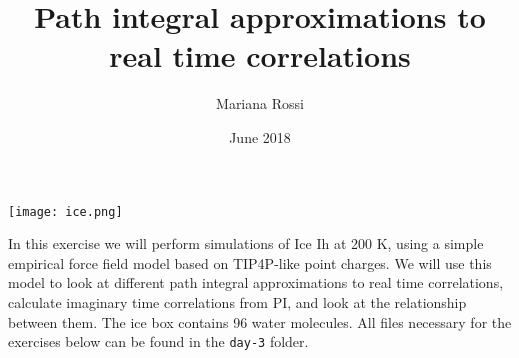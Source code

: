 \documentclass{article}
\title{Path integral approximations to real time correlations}
\author{Mariana Rossi}
\date{June 2018}
\begin{document}
\maketitle

\begin{figure*}[ht]
\centering
\texttt{[image: ice.png]}
\end{figure*}

In this exercise we will perform
simulations of Ice Ih at 200 K,
using a simple empirical force field model based
on TIP4P-like point charges. We will use this model to look
at different path integral approximations to real time correlations, calculate imaginary
time correlations from PI, and look at the relationship between them. The ice box contains 96 water molecules.
All files necessary for the exercises below can be found in the \texttt{day-3} folder.






\end{document}
